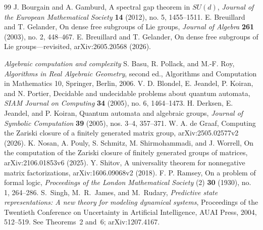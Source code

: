 \begin{thebibliography}{99}
 J. Bourgain and A. Gamburd, A spectral gap theorem in $SU(d)$, \emph{Journal of the European Mathematical Society} \textbf{14} (2012), no. 5, 1455--1511.
 E. Breuillard and T. Gelander, On dense free subgroups of Lie groups, \emph{Journal of Algebra} \textbf{261} (2003), no. 2, 448--467.
 E. Breuillard and T. Gelander, On dense free subgroups of Lie groups---revisited, arXiv:2605.20568 (2026).
\item[]\textit{Algebraic computation and complexity}
 S. Basu, R. Pollack, and M.-F. Roy, \emph{Algorithms in Real Algebraic Geometry}, second ed., Algorithms and Computation in Mathematics 10, Springer, Berlin, 2006.
 V. D. Blondel, E. Jeandel, P. Koiran, and N. Portier, Decidable and undecidable problems about quantum automata, \emph{SIAM Journal on Computing} \textbf{34} (2005), no. 6, 1464--1473.
 H. Derksen, E. Jeandel, and P. Koiran, Quantum automata and algebraic groups, \emph{Journal of Symbolic Computation} \textbf{39} (2005), nos. 3--4, 357--371.
 W. A. de Graaf, Computing the Zariski closure of a finitely generated matrix group, arXiv:2505.02577v2 (2026).
 K. Nosan, A. Pouly, S. Schmitz, M. Shirmohammadi, and J. Worrell, On the computation of the Zariski closure of finitely generated groups of matrices, arXiv:2106.01853v6 (2025).
 Y. Shitov, A universality theorem for nonnegative matrix factorizations, arXiv:1606.09068v2 (2018).
 F. P. Ramsey, On a problem of formal logic, \emph{Proceedings of the London Mathematical Society} (2) \textbf{30} (1930), no. 1, 264--286.
S.~Singh, M.~R.~James, and M.~Rudary,
\emph{Predictive state representations: A new theory for modeling dynamical systems},
Proceedings of the Twentieth Conference on Uncertainty in Artificial Intelligence,
AUAI Press, 2004, 512--519. See Theorems~2 and~6; arXiv:1207.4167.
\end{thebibliography}
